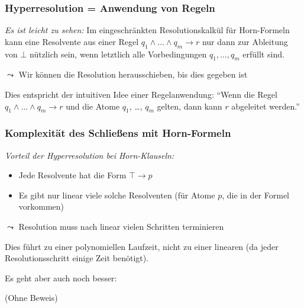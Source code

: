 \documentclass[onlymath]{beamer}
\begin{document}
\begin{frame}\frametitle{Hyperresolution = Anwendung von Regeln}

\emph{Es ist leicht zu sehen:} Im eingeschränkten Resolutionskalkül für Horn-Formeln kann eine Resolvente aus einer Regel $q_1\wedge\ldots\wedge q_m\to r$
nur dann zur Ableitung von $\bot$ nützlich sein, wenn letztlich alle Vorbedingungen $q_1,\ldots, q_m$ erfüllt sind.

$\leadsto$ Wir können die Resolution herausschieben, bis dies gegeben ist
\bigskip\pause

%
Dies entspricht der intuitiven Idee einer \alert{Regelanwendung}: "`Wenn die Regel $q_1\wedge\ldots\wedge q_m\to r$ und die Atome $q_1$, \ldots, $q_m$ gelten, dann kann $r$ abgeleitet werden."'

\end{frame}

\begin{frame}\frametitle{Komplexität des Schließens mit Horn-Formeln}

\emph{Vorteil der Hyperresolution bei Horn-Klauseln:}
\begin{itemize}
\item Jede Resolvente hat die Form $\top\to p$
\item Es gibt nur linear viele solche Resolventen (für Atome $p$, die in der Formel vorkommen)
\end{itemize}
$\leadsto$ Resolution muss nach linear vielen Schritten terminieren
\pause\bigskip

Dies führt zu einer polynomiellen Laufzeit, nicht zu einer linearen (da jeder Resolutionsschritt einige Zeit benötigt).
\medskip

Es geht aber auch noch besser:


(Ohne Beweis)


\end{frame}
\end{document}
